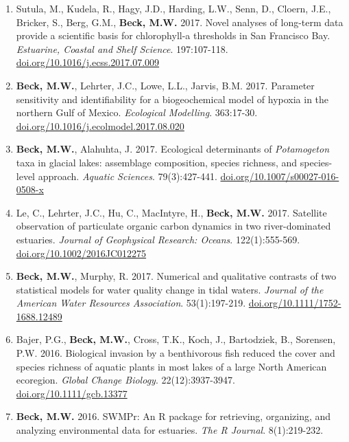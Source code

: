 \documentclass[letterpaper,12pt]{article}
\begin{document}
\begin{enumerate}
\item Sutula, M., Kudela, R., Hagy, J.D., Harding, L.W., Senn, D., Cloern, J.E., Bricker, S., Berg, G.M., \textbf{Beck, M.W.} 2017. Novel analyses of long-term data provide a scientific basis for chlorophyll-a thresholds in San Francisco Bay. \textit{Estuarine, Coastal and Shelf Science}. 197:107-118. {\footnotesize\href{https://doi.org/10.1016/j.ecss.2017.07.009}{doi.org/10.1016/j.ecss.2017.07.009}}

\item \textbf{Beck, M.W.}, Lehrter, J.C., Lowe, L.L., Jarvis, B.M. 2017. Parameter sensitivity and identifiability for a biogeochemical model of hypoxia in the northern Gulf of Mexico. \textit{Ecological Modelling}. 363:17-30. {\footnotesize\href{http://dx.doi.org/10.1016/j.ecolmodel.2017.08.020}{doi.org/10.1016/j.ecolmodel.2017.08.020}}

\item \textbf{Beck, M.W.}, Alahuhta, J. 2017. Ecological determinants of \textit{Potamogeton} taxa in glacial lakes: assemblage composition, species richness, and species-level approach. \textit{Aquatic Sciences}. 79(3):427-441. {\footnotesize\href{https://doi.org/10.1007/s00027-016-0508-x}{doi.org/10.1007/s00027-016-0508-x}}

\item Le, C., Lehrter, J.C., Hu, C., MacIntyre, H., \textbf{Beck, M.W.} 2017. Satellite observation of particulate organic carbon dynamics in two river-dominated estuaries. \textit{Journal of Geophysical Research: Oceans}. 122(1):555-569. {\footnotesize\href{http://dx.doi.org/10.1002/2016JC012275}{doi.org/10.1002/2016JC012275}}

\item \textbf{Beck, M.W.}, Murphy, R. 2017. Numerical and qualitative contrasts of two statistical models for water quality change in tidal waters. \textit{Journal of the American Water Resources Association}. 53(1):197-219. {\footnotesize\href{http://dx.doi.org/10.1111/1752-1688.12489}{doi.org/10.1111/1752-1688.12489}}

\item Bajer, P.G., \textbf{Beck, M.W.}, Cross, T.K., Koch, J., Bartodziek, B., Sorensen, P.W. 2016. Biological invasion by a benthivorous fish reduced the cover and species richness of aquatic plants in most lakes of a large North American ecoregion. \textit{Global Change Biology}. 22(12):3937-3947. {\footnotesize\href{http://dx.doi.org/10.1111/gcb.13377}{doi.org/10.1111/gcb.13377}}

\item \textbf{Beck, M.W.} 2016. SWMPr: An R package for retrieving, organizing, and analyzing environmental data for estuaries. \textit{The R Journal}. 8(1):219-232.


\end{enumerate}
\end{document}
